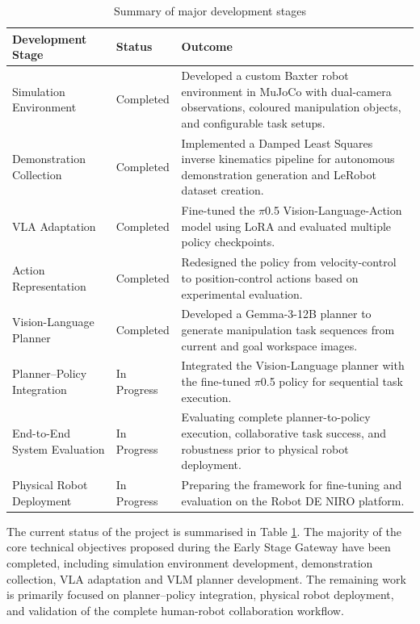 \documentclass[conference, 12pt]{IEEEtran}
\begin{document}
\begin{table}[h]
\centering
\caption{Summary of major development stages}
\label{tab:development_summary}
\renewcommand{\arraystretch}{1.2}
\begin{tabular}{p{4cm} p{2cm} p{8cm}}
\hline
\textbf{Development Stage} & \textbf{Status} & \textbf{Outcome} \\
\hline

Simulation Environment &
Completed &
Developed a custom Baxter robot environment in MuJoCo with dual-camera observations, coloured manipulation objects, and configurable task setups. \\

Demonstration Collection &
Completed &
Implemented a Damped Least Squares inverse kinematics pipeline for autonomous demonstration generation and LeRobot dataset creation. \\

VLA Adaptation &
Completed &
Fine-tuned the $\pi$0.5 Vision-Language-Action model using LoRA and evaluated multiple policy checkpoints. \\

Action Representation &
Completed &
Redesigned the policy from velocity-control to position-control actions based on experimental evaluation. \\

Vision-Language Planner &
Completed &
Developed a Gemma-3-12B planner to generate manipulation task sequences from current and goal workspace images. \\

Planner--Policy Integration &
In Progress &
Integrated the Vision-Language planner with the fine-tuned $\pi$0.5 policy for sequential task execution. \\

End-to-End System Evaluation &
In Progress &
Evaluating complete planner-to-policy execution, collaborative task success, and robustness prior to physical robot deployment. \\

Physical Robot Deployment &
In Progress &
Preparing the framework for fine-tuning and evaluation on the Robot DE NIRO platform. \\

\hline
\end{tabular}
\end{table}


The current status of the project is summarised in Table \ref{tab:development_summary}. The majority of the core technical objectives proposed during the Early Stage Gateway have been completed, including simulation environment development, demonstration collection, VLA adaptation and VLM planner development. The remaining work is primarily focused on planner--policy integration, physical robot deployment, and validation of the complete human-robot collaboration workflow.
\end{document}
